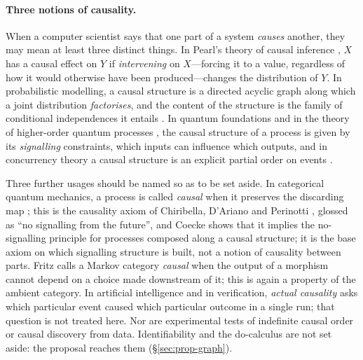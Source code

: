 
\paragraph{Three notions of causality.}
When a computer scientist says that one part of a system \emph{causes} another, they may mean at least three distinct things. In Pearl's theory of causal inference \cite{pearl2009causality}, $X$ has a causal effect on $Y$ if \emph{intervening} on $X$---forcing it to a value, regardless of how it would otherwise have been produced---changes the distribution of $Y$. In probabilistic modelling, a causal structure is a directed acyclic graph along which a joint distribution \emph{factorises}, and the content of the structure is the family of conditional independences it entails \cite{pearl2009causality,fritz2023dseparation}. In quantum foundations and in the theory of higher-order quantum processes \cite{kissinger2019categorical,oreshkov2012noncausal}, the causal structure of a process is given by its \emph{signalling} constraints, which inputs can influence which outputs, and in concurrency theory a causal structure is an explicit partial order on events \cite{lamport1978time,pratt1986pomsets}.

Three further usages should be named so as to be set aside. In categorical quantum mechanics, a process is called \emph{causal} when it preserves the discarding map \cite{PQP_Coecke_Kissinger_2017}; this is the causality axiom of Chiribella, D'Ariano and Perinotti \cite{chiribella2010purification}, glossed as ``no signalling from the future'', and Coecke \cite{coecke2014terminality} shows that it implies the no-signalling principle for processes composed along a causal structure; it is the base axiom on which signalling structure is built, not a notion of causality between parts. Fritz \cite{fritz2020synthetic} calls a Markov category \emph{causal} when the output of a morphism cannot depend on a choice made downstream of it; this is again a property of the ambient category. In artificial intelligence and in verification, \emph{actual causality} \cite{halpern2016actual} asks which particular event caused which particular outcome in a single run; that question is not treated here. Nor are experimental tests of indefinite causal order or causal discovery from data. Identifiability and the do-calculus are not set aside: the proposal reaches them (\S\ref{sec:prop-graph}).

